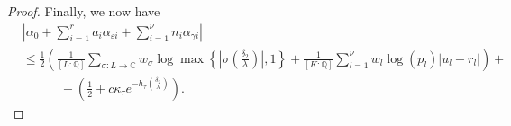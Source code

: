 \begin{proof}
Finally, we now have
\begin{align*}
&\left|\alpha_0+\sum_{i = 1}^r a_i \alpha_{\varepsilon i} + \sum_{i = 1}^{\nu} n_i \alpha_{\gamma i}\right|\\
	& \leq \frac{1}{2}\left(\frac{1}{[L:\mathbb{Q}]}\sum_{\sigma :L \to \mathbb{C}} w_{\sigma}\log \max \left\{ \left|\sigma\left(\frac{\delta_2}{\lambda}\right)\right|, 1\right\} + \frac{1}{[K:\mathbb{Q}]}\sum_{l = 1}^{\nu}w_l \log(p_l)|u_l - r_l|\right) + \\
	& \quad \quad \quad + \left(\frac{1}{2} + c\kappa_{\tau}e^{-h_{\tau}\left(\frac{\delta_2}{\lambda}\right)}\right).
\end{align*} 

%
%

\end{proof}
